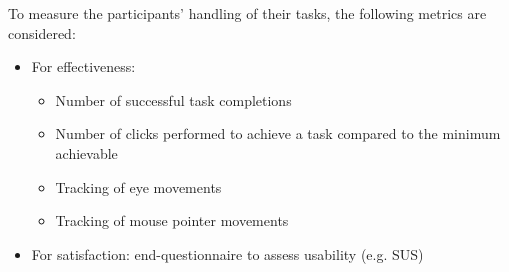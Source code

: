 \documentclass[twocolumn, letterpaper,13pt]{scrartcl}
\begin{document}
    To measure the participants' handling of their tasks, the following metrics are considered:
    
    \begin{itemize}
        \item For effectiveness: 
        \begin{itemize}
            \item Number of successful task completions
            \item Number of clicks performed to achieve a task compared to the minimum achievable
            \item Tracking of eye movements
            \item Tracking of mouse pointer movements
        \end{itemize}
        \item For satisfaction: end-questionnaire to assess usability (e.g. SUS)
    \end{itemize}
    
\end{document}
